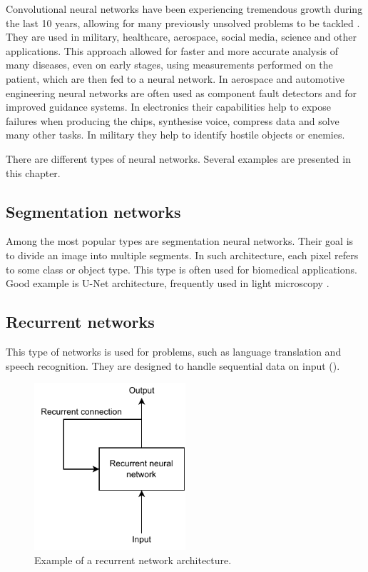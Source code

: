 Convolutional neural networks have been experiencing tremendous growth during the last 10 years, allowing for many previously unsolved problems to be tackled \cite{li2021survey}. They are used in military, healthcare, aerospace, social media, science and other applications. This approach allowed for faster and more accurate analysis of many diseases, even on early stages, using measurements performed on the patient, which are then fed to a neural network. In aerospace and automotive engineering neural networks are often used as component fault detectors and for improved guidance systems. In electronics their capabilities help to expose failures when producing the chips, synthesise voice, compress data and solve many other tasks. In military they help to identify hostile objects or enemies. 


There are different types of neural networks. Several examples are presented in this chapter.

\subsection{Segmentation networks}
Among the most popular types are segmentation neural networks. Their goal is to divide an image into multiple segments. In such architecture, each pixel refers to some class or object type. This type is often used for biomedical applications. Good example is U-Net architecture, frequently used in light microscopy \cite{ronneberger2015u}.

\subsection{Recurrent networks}

This type of networks is used for problems, such as language translation and speech recognition. They are designed to handle sequential data on input ().

\begin{figure}[!h]
  \centering
  \includegraphics[width=0.5\textwidth]{./fig/photos/recurrent.pdf}

  \caption{Example of a recurrent network architecture.}
  \label{fig:recurrent}
\end{figure}

